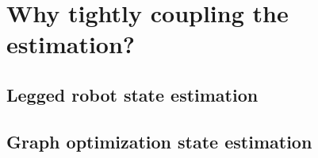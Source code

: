 \chapter{Why tightly coupling the estimation?}
\section{Legged robot state estimation}

\cite{fallon2014drift}

\section{Graph optimization state estimation}

\cite{dellaert2017factor}